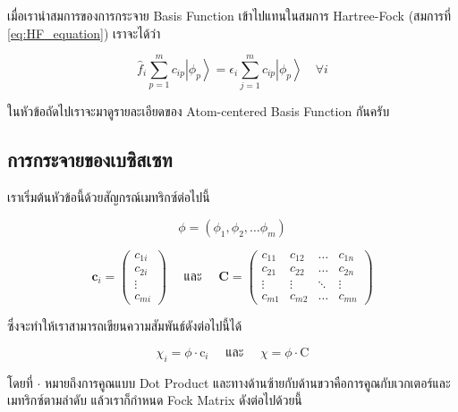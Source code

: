 เมื่อเรานำสมการของการกระจาย Basis Function เข้าไปแทนในสมการ Hartree-Fock (สมการที่ \eqref{eq:HF_equation}) เราจะได้ว่า

\begin{equation}
  \label{eq:HF_equation_LCMO}
  \hat{f}_i \sum_{p=1}^m c_{i p}\left|\phi_p\right\rangle
  =
  \epsilon_i \sum_{j=1}^m c_{i p}\left|\phi_p\right\rangle \quad \forall i
\end{equation}

ในหัวข้อถัดไปเราจะมาดูรายละเอียดของ Atom-centered Basis Function กันครับ

\subsection{การกระจายของเบซิสเซท}

เราเริ่มต้นหัวข้อนี้ด้วยสัญกรณ์เมทริกซ์ต่อไปนี้

\begin{equation}
  \phi
  =
  \left(\phi_1, \phi_2, \dots \phi_m\right)
\end{equation}

\begin{equation}
  \bm{c}_i
  = \left(
  \begin{array}{c}
      c_{1 i} \\
      c_{2 i} \\
      \vdots  \\
      c_{m i}
    \end{array}
  \right)
  \quad \text{ และ } \quad
  \bm{C}
  = \left(
  \begin{array}{cccc}
      c_{11}  & c_{12}  & \ldots & c_{1 n} \\
      c_{21}  & c_{22}  & \ldots & c_{2 n} \\
      \vdots  & \vdots  & \ddots & \vdots  \\
      c_{m 1} & c_{m 2} & \ldots & c_{m n}
    \end{array}
  \right)
\end{equation}

\noindent ซึ่งจะทำให้เราสามารถเขียนความสัมพันธ์ดังต่อไปนี้ได้

\begin{equation}
  \chi_i = \phi \cdot \mathrm{c}_i
  \quad \text{ และ } \quad
  \chi = \phi \cdot \mathrm{C}
\end{equation}

\noindent โดยที่ $\cdot$ หมายถึงการคูณแบบ Dot Product และทางด้านซ้ายกับด้านขวาคือการคูณกับเวกเตอร์และเมทริกซ์ตามลำดับ
แล้วเราก็กำหนด Fock Matrix ดังต่อไปด้วยนี้


